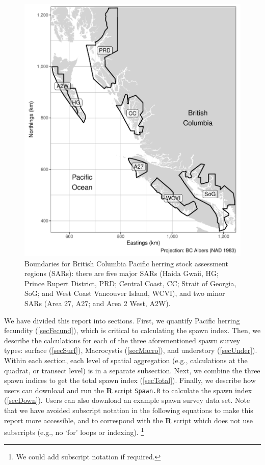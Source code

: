 \documentclass[12pt]{article}
\begin{document}
\begin{figure}
\centering
\includegraphics[width=\linewidth]{Figures/BC.pdf}
\caption[Boundaries for Pacific herring stock assessment regions (SARs)]
{Boundaries for British Columbia Pacific herring stock assessment regions (SARs): there are five major SARs (Haida Gwaii, HG; Prince Rupert District, PRD; Central Coast, CC; Strait of Georgia, SoG; and West Coast Vancouver Island, WCVI), and two minor SARs (Area 27, A27; and Area 2 West, A2W).}
\label{figBC}
\end{figure}

We have divided this report into sections.
First, we quantify Pacific herring fecundity (\autoref{secFecund}), which is critical to calculating the spawn index.
Then, we describe the calculations for each of the three aforementioned spawn survey types: surface (\autoref{secSurf}), Macrocystis (\autoref{secMacro}), and understory (\autoref{secUnder}).
Within each section, each level of spatial aggregation (e.g., calculations at the quadrat, or transect level) is in a separate subsection.
Next, we combine the three spawn indices to get the total spawn index (\autoref{secTotal}).
Finally, we describe how users can download and run the \textbf{R} script \texttt{Spawn.R} to calculate the spawn index (\autoref{secDown}).
Users can also download an example spawn survey data set.
Note that we have avoided subscript notation in the following equations to make this report more accessible, and to correspond with the \textbf{R} script which does not use subscripts (e.g., no `for' loops or indexing).%
\footnote{We could add subscript notation if required.}
\end{document}
